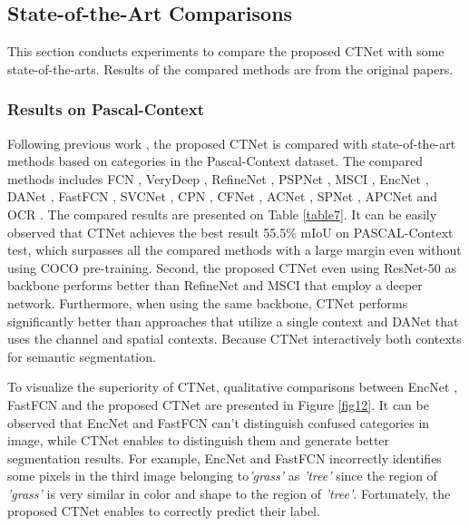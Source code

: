 \documentclass[10pt,journal,cspaper,compsoc]{IEEEtran}
\begin{document}
	
\subsection{State-of-the-Art Comparisons}
This section conducts experiments to compare the proposed CTNet with some state-of-the-arts. Results of the compared methods are from the original papers.
	
\subsubsection{Results on Pascal-Context}
Following previous work \cite{yuan2020object, ding2019acnet}, the proposed CTNet is compared with state-of-the-art methods based on  categories in the Pascal-Context dataset. The compared methods includes FCN \cite{shelhamer2017fully}, VeryDeep \cite{wang2017learning}, RefineNet \cite{lin2017refinenet}, PSPNet \cite{zhao2017pyramid}, MSCI \cite{lin2018multi}, EncNet \cite{zhang2018context}, DANet \cite{fu2019dual}, FastFCN \cite{wu2019fastfcn}, SVCNet \cite{ding2019semantic}, CPN \cite{yu2020context}, CFNet \cite{zhang2019co}, ACNet \cite{ding2019acnet}, SPNet \cite{hou2020strip}, APCNet \cite{he2019adaptive} and OCR \cite{yuan2020object}. The compared results are presented on Table \ref{table7}. It can be easily observed that CTNet achieves the best result 55.5\% mIoU on PASCAL-Context test, which surpasses all the compared methods with a large margin even without using COCO pre-training. Second, the proposed CTNet even using ResNet-50 as backbone performs better than RefineNet \cite{lin2017refinenet} and MSCI \cite{lin2018multi} that employ a deeper network. Furthermore, when using the same backbone, CTNet performs significantly better than approaches that utilize a single context and DANet that uses the channel and spatial contexts. Because CTNet interactively both contexts for semantic segmentation.

To visualize the superiority of CTNet, qualitative comparisons between EncNet \cite{zhang2018context}, FastFCN \cite{wu2019fastfcn} and the proposed CTNet are presented in Figure \ref{fig12}. It can be observed that EncNet and FastFCN can't distinguish confused categories in image, while CTNet enables to distinguish them and generate better segmentation results. For example, EncNet and FastFCN incorrectly identifies some pixels in the third image belonging to\textit{'grass'} as \textit{'tree'} since the region of \textit{'grass'} is very similar in color and shape to the region of \textit{'tree'}. Fortunately, the proposed CTNet enables to correctly predict their label.
	
\end{document}

